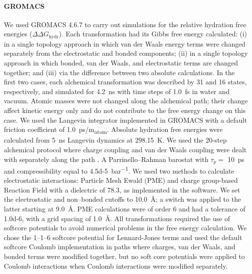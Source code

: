 \documentclass[journal=jctcce,manuscript=article]{achemso}
\begin{document}
\paragraph{GROMACS} We used GROMACS 4.6.7 to carry out simulations for 
the relative hydration free energies ($\Delta \Delta G_{\mathrm{hydr}}$).
Each transformation had its Gibbs free energy calculated: (i) in a single 
topology approach in which van der Waals energy terms were changed separately 
from the electrostatic and bonded components; (ii) in a single topology 
approach in which bonded, van der Waals, and electrostatic terms are changed 
together;  and (iii) via the difference between two absolute calculations.
In the first two cases, each alchemical transformation was described by 31 and 
16 states, respectively, and simulated for \SI{4.2}{ns} with time steps of 
\SI{1.0}{fs} in water and vacuum. Atomic masses were not changed along the 
alchemical path;
their change affect kinetic energy only and do not contribute to the free 
energy change on this case. 
We used the Langevin integrator implemented in GROMACS with a 
default friction coefficient of \SI{1.0}{ps/m_{atom}}. 
Absolute hydration free energies were calculated from \SI{5}{ns} Langevin dynamics
at \SI{298.15}{K}. We used the 20-step alchemical protocol where charge coupling and
van der Waals coupling were dealt with separately along the path \cite{Mobley2014, doi:10.1021/acs.jced.7b00104}.
A Parrinello--Rahman barostat with $\tau_p =$ \SI{10}{ps} and compressibility 
equal to \SI{4.5d-5}{bar^{-1}}.
We used two methods to calculate electrostatic interactions: Particle Mesh 
Ewald (PME) and charge group-based Reaction Field with a dielectric of 78.3, 
as implemented in the software. 
We set the electrostatic and non--bonded cutoffs to \SI{10.0}{\angstrom};
a switch was applied to the latter starting at \SI{9.0}{\angstrom}. 
PME calculations were of order 6 and had a 
tolerance of \num{1.0d-6}, with a grid spacing of \SI{1.0}{\angstrom}. 
All transformations required the use of softcore potentials to avoid numerical 
problems in the free energy calculation.  We chose the 1--1--6 softcore 
potential for Lennard-Jones terms and used the default softcore Coulomb 
implementation in paths where charges, van der Waals, and bonded terms were 
modified together, but no soft core potentials were applied to Coulomb 
interactions when Coulomb interactions were modified separately.
\end{document}
